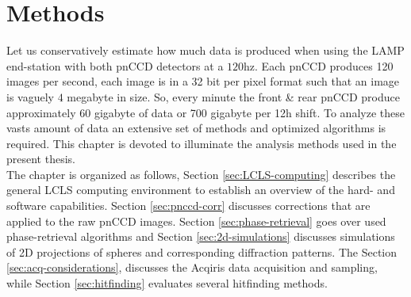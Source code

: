 \chapter{Methods}\label{ch:methods}
Let us conservatively estimate  how much data is produced when using the LAMP end-station with both pnCCD detectors at a $120$hz. Each pnCCD produces 120 images per second, each image is in a 32 bit per pixel format such that an image is vaguely $4$ megabyte in size. So, every minute the front \& rear pnCCD produce approximately $60$ gigabyte of data or 700 gigabyte per 12h shift. To analyze these vasts amount of data an extensive set of methods and optimized algorithms is required. This chapter is devoted to illuminate the analysis methods used in the present thesis.\\
The chapter is organized as follows, Section \ref{sec:LCLS-computing} describes the general LCLS computing environment to establish an overview of the hard- and software capabilities. Section \ref{sec:pnccd-corr} discusses corrections that are applied to the raw pnCCD images.  Section \ref{sec:phase-retrieval} goes over used phase-retrieval algorithms and Section \ref{sec:2d-simulations} discusses simulations of 2D projections of spheres and corresponding diffraction patterns. The Section \ref{sec:acq-considerations}, discusses the Acqiris data acquisition and sampling, while Section \ref{sec:hitfinding} evaluates several hitfinding methods.
%
%
%
